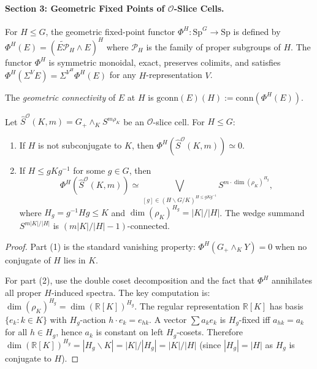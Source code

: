 
\paragraph{Section 3: Geometric Fixed Points of $\mathcal{O}$-Slice Cells.}

\begin{definition}\label{def:p5-gfp}
For $H \leq G$, the geometric fixed-point functor
$\Phi^H : \mathrm{Sp}^G \to \mathrm{Sp}$ is defined by
$\Phi^H(E) = (\widetilde{E\mathcal{P}}_H \wedge E)^H$
where $\mathcal{P}_H$ is the family of proper subgroups of $H$.
The functor $\Phi^H$ is symmetric monoidal, exact, preserves colimits,
and satisfies $\Phi^H(\Sigma^V E) = \Sigma^{V^H} \Phi^H(E)$ for any
$H$-representation $V$.

The \emph{geometric connectivity} of $E$ at $H$ is
$\mathrm{gconn}(E)(H) := \mathrm{conn}(\Phi^H(E))$.
\end{definition}

\begin{lemma}\label{lem:p5-phi-cells}
Let $\widehat{S}^{\mathcal{O}}(K,m) = G_+ \wedge_K S^{m\rho_K}$
be an $\mathcal{O}$-slice cell. For $H \leq G$:
\begin{enumerate}
  \item If $H$ is not subconjugate to $K$, then
    $\Phi^H(\widehat{S}^{\mathcal{O}}(K,m)) \simeq 0$.
  \item If $H \leq gKg^{-1}$ for some $g \in G$, then
    \[
      \Phi^H(\widehat{S}^{\mathcal{O}}(K,m)) \simeq
      \bigvee_{[g] \in (H \backslash G / K)^{H \leq gKg^{-1}}}
      S^{m \cdot \dim(\rho_K)^{H_g}},
    \]
    where $H_g = g^{-1}Hg \leq K$ and $\dim(\rho_K)^{H_g} = |K|/|H|$.
    The wedge summand $S^{m|K|/|H|}$ is $(m|K|/|H| - 1)$-connected.
\end{enumerate}
\end{lemma}

\begin{proof}
Part (1) is the standard vanishing property: $\Phi^H(G_+ \wedge_K Y) = 0$
when no conjugate of $H$ lies in $K$.

For part (2), use the double coset decomposition and the fact that $\Phi^H$
annihilates all proper $H$-induced spectra. The key computation is:
$\dim(\rho_K)^{H_g} = \dim(\mathbb{R}[K])^{H_g}$.
The regular representation $\mathbb{R}[K]$ has basis $\{e_k : k \in K\}$
with $H_g$-action $h \cdot e_k = e_{hk}$. A vector $\sum a_k e_k$ is
$H_g$-fixed iff $a_{hk} = a_k$ for all $h \in H_g$, hence $a_k$ is
constant on left $H_g$-cosets. Therefore
$\dim(\mathbb{R}[K])^{H_g} = |H_g \backslash K| = |K|/|H_g| = |K|/|H|$
(since $|H_g| = |H|$ as $H_g$ is conjugate to $H$).
\end{proof}

